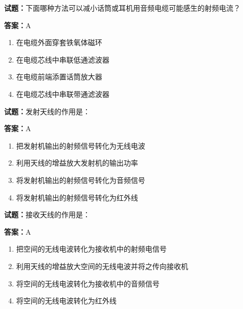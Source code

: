 \documentclass{ctexbook}
\begin{document}
\vspace{1em}

\textbf{试题：}下面哪种方法可以减小话筒或耳机用音频电缆可能感生的射频电流？ 

\textbf{答案：}A 

\begin{enumerate}[leftmargin=3em]
  \item 在电缆外面穿套铁氧体磁环 

  \item 在电缆芯线中串联低通滤波器 

  \item 在电缆前端添置话筒放大器 

  \item 在电缆芯线中串联带通滤波器 

\end{enumerate}





\vspace{1em}

\textbf{试题：}发射天线的作用是： 

\textbf{答案：}A 

\begin{enumerate}[leftmargin=3em]
  \item 把发射机输出的射频信号转化为无线电波 

  \item 利用天线的增益放大发射机的输出功率 

  \item 将发射机输出的射频信号转化为音频信号 

  \item 将发射机输出的射频信号转化为红外线 

\end{enumerate}





\vspace{1em}

\textbf{试题：}接收天线的作用是： 

\textbf{答案：}A 

\begin{enumerate}[leftmargin=3em]
  \item 把空间的无线电波转化为接收机中的射频电信号 

  \item 利用天线的增益放大空间的无线电波并将之传向接收机 

  \item 将空间的无线电波转化为接收机中的音频信号 

  \item 将空间的无线电波转化为红外线 

\end{enumerate}
\end{document}
